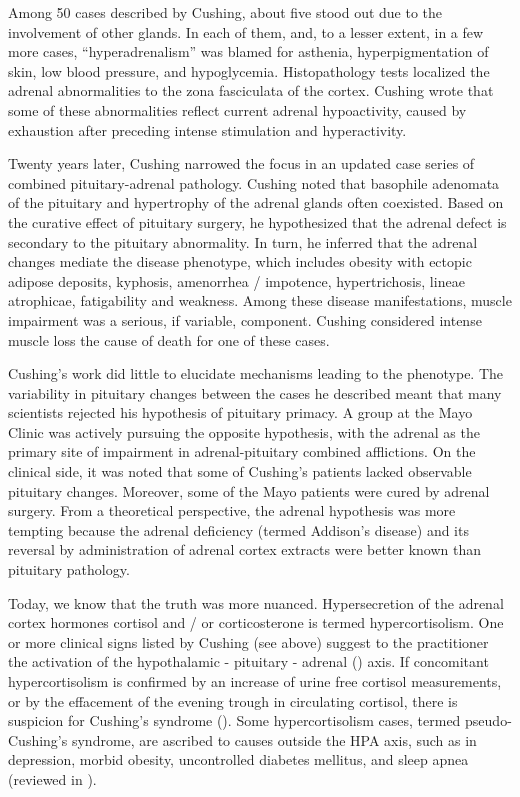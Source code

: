 \documentclass[12pt,english]{report}\usepackage[]{graphicx}\usepackage[]{color}
\begin{document}
Among 50 cases described by Cushing, about five stood out due to the
involvement of other glands. In each of them, and, to a lesser extent,
in a few more cases, ``hyperadrenalism'' was blamed for asthenia,
hyperpigmentation of skin, low blood pressure, and hypoglycemia. Histopathology
tests localized the adrenal abnormalities to the zona fasciculata
of the cortex. Cushing wrote that some of these abnormalities reflect
current adrenal hypoactivity, caused by exhaustion after preceding
intense stimulation and hyperactivity.

Twenty years later, Cushing narrowed the focus in an updated case
series of combined pituitary-adrenal pathology\citep{cushing1932basophil}.
Cushing noted that basophile adenomata of the pituitary and hypertrophy
of the adrenal glands often coexisted. Based on the curative effect
of pituitary surgery, he hypothesized that the adrenal defect is secondary
to the pituitary abnormality. In turn, he inferred that the adrenal
changes mediate the disease phenotype, which includes obesity with
ectopic adipose deposits, kyphosis, amenorrhea / impotence, hypertrichosis,
lineae atrophicae, fatigability and weakness. Among these disease
manifestations, muscle impairment was a serious, if variable, component.
Cushing considered intense muscle loss the cause of death for one
of these cases.

Cushing's work did little to elucidate mechanisms leading to the phenotype.
The variability in pituitary changes between the cases he described
meant that many scientists rejected his hypothesis of pituitary primacy.
A group at the Mayo Clinic was actively pursuing the opposite hypothesis,
with the adrenal as the primary site of impairment in adrenal-pituitary
combined afflictions\citep{kepler1949cushings}. On the clinical side,
it was noted that some of Cushing's patients lacked observable pituitary
changes. Moreover, some of the Mayo patients were cured by adrenal
surgery. From a theoretical perspective, the adrenal hypothesis was
more tempting because the adrenal deficiency (termed Addison's disease)
and its reversal by administration of adrenal cortex extracts were
better known than pituitary pathology\citep{thorn1939treatment}.

Today, we know that the truth was more nuanced. Hypersecretion of
the adrenal cortex hormones cortisol and / or corticosterone is termed
hypercortisolism. One or more clinical signs listed by Cushing (see
above) suggest to the practitioner the activation of the hypothalamic
- pituitary - adrenal ()
axis. If concomitant hypercortisolism is confirmed by an increase
of urine free cortisol measurements, or by the effacement of the evening
trough in circulating cortisol, there is suspicion for Cushing's syndrome
()\citep{nieman2008diagnosis}.
Some hypercortisolism cases, termed pseudo-Cushing's syndrome, are
ascribed to causes outside the HPA axis, such as in depression, morbid
obesity, uncontrolled diabetes mellitus, and sleep apnea (reviewed
in \citep{nieman2002diagnostic}).
\end{document}
